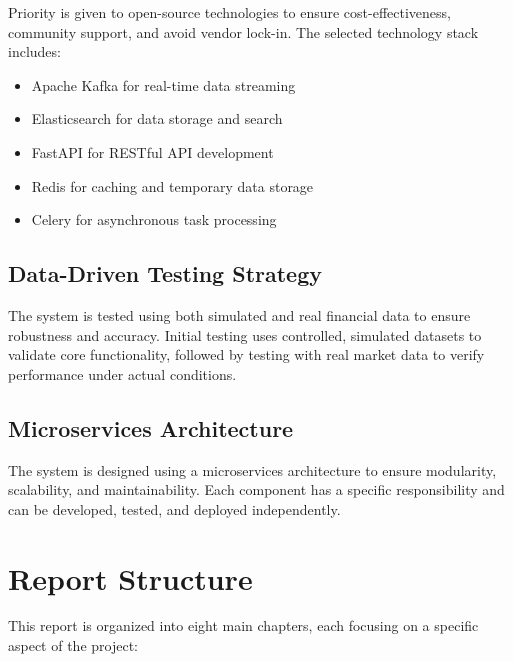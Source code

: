 Priority is given to open-source technologies to ensure cost-effectiveness, community support, and avoid vendor lock-in. The selected technology stack includes:
\begin{itemize}
    \item Apache Kafka for real-time data streaming
    \item Elasticsearch for data storage and search
    \item FastAPI for RESTful API development
    \item Redis for caching and temporary data storage
    \item Celery for asynchronous task processing
\end{itemize}

\subsection{Data-Driven Testing Strategy}

The system is tested using both simulated and real financial data to ensure robustness and accuracy. Initial testing uses controlled, simulated datasets to validate core functionality, followed by testing with real market data to verify performance under actual conditions.

\subsection{Microservices Architecture}

The system is designed using a microservices architecture to ensure modularity, scalability, and maintainability. Each component has a specific responsibility and can be developed, tested, and deployed independently.

\section{Report Structure}

This report is organized into eight main chapters, each focusing on a specific aspect of the project:

